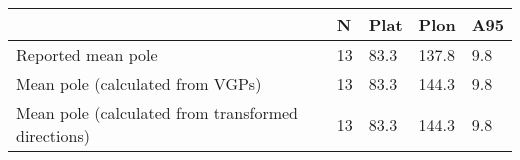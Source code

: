 \begin{tabular}{lllll}
\toprule
{} &   N &  Plat &   Plon &  A95 \\
\midrule
Reported mean pole                                 &  13 &  83.3 &  137.8 &  9.8 \\
Mean pole (calculated from VGPs)                   &  13 &  83.3 &  144.3 &  9.8 \\
Mean pole (calculated from transformed directions) &  13 &  83.3 &  144.3 &  9.8 \\
\bottomrule
\end{tabular}

